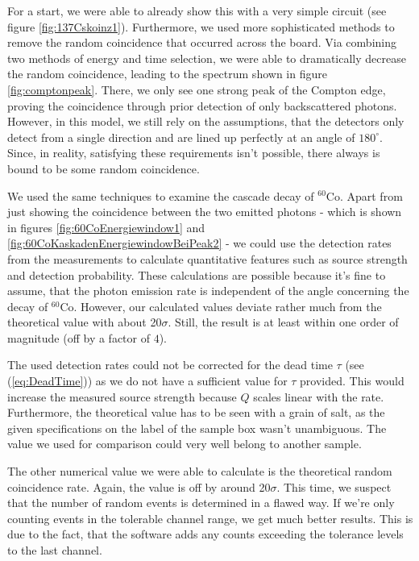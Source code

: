 For a start, we were able to already show this with a very simple circuit (see figure \ref{fig:137Cskoinz1}).
Furthermore, we used more sophisticated methods to remove the random coincidence that occurred across the board.
Via combining two methods of energy and time selection, we were able to dramatically decrease the random coincidence, leading to the spectrum shown in figure \ref{fig:comptonpeak}.
There, we only see one strong peak of the Compton edge, proving the coincidence through prior detection of only backscattered photons.
However, in this model, we still rely on the assumptions, that the detectors only detect from a single direction and are lined up perfectly at an angle of $180^{\circ}$.
Since, in reality, satisfying these requirements isn't possible, there always is bound to be some random coincidence.
%
\par
%
We used the same techniques to examine the cascade decay of $^{60}\text{Co}$.
Apart from just showing the coincidence between the two emitted photons - which is shown in figures \ref{fig:60CoEnergiewindow1} and \ref{fig:60CoKaskadenEnergiewindowBeiPeak2} - we could use the detection rates from the measurements to calculate quantitative features such as source strength and detection probability.
These calculations are possible because it's fine to assume, that the photon emission rate is independent of the angle concerning the decay of $^{60}\text{Co}$.
However, our calculated values deviate rather much from the theoretical value with about \SI{20}{}$\sigma$.
Still, the result is at least within one order of magnitude (off by a factor of $4$).
%
\par
%
The used detection rates could not be corrected for the dead time $\tau$ (see (\ref{eq:DeadTime})) as we do not have a sufficient value for $\tau$ provided.
This would increase the measured source strength because $Q$ scales linear with the rate.
Furthermore, the theoretical value has to be seen with a grain of salt, as the given specifications on the label of the sample box wasn't unambiguous.
The value we used for comparison could very well belong to another sample.
%
\par
%
The other numerical value we were able to calculate is the theoretical random coincidence rate.
Again, the value is off by around \SI{20}{}$\sigma$.
This time, we suspect that the number of random events is determined in a flawed way.
If we're only counting events in the tolerable channel range, we get much better results.
This is due to the fact, that the software adds any counts exceeding the tolerance levels to the last channel.
